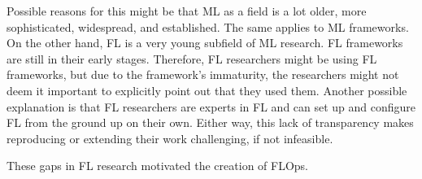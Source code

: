 Possible reasons for this might be that ML as a field is a lot older, more sophisticated,
widespread, and established.
The same applies to ML frameworks.
On the other hand, FL is a very young subfield of ML research.
FL frameworks are still in their early stages.
Therefore, FL researchers might be using FL frameworks, but due to the framework's immaturity,
the researchers might not deem it important to explicitly point out that they used them.
Another possible explanation is that FL researchers are experts in FL and
can set up and configure FL from the ground up on their own.
Either way, this lack of transparency makes reproducing or extending
their work challenging, if not infeasible.

These gaps in FL research motivated the creation of FLOps.
